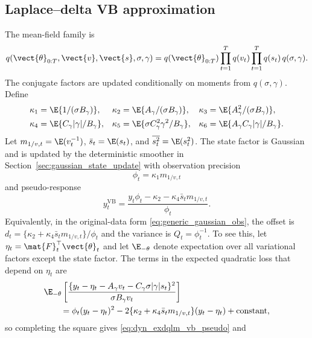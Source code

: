 \subsection{Laplace--delta VB approximation}

The mean-field family is
\begin{equation}
q(\vect{\theta}_{0:T},\vect{v},\vect{s},\sigma,\gamma)
=q(\vect{\theta}_{0:T})\prod_{t=1}^Tq(v_t)\prod_{t=1}^Tq(s_t)\,q(\sigma,\gamma).
\label{eq:dyn_exdqlm_mf}
\end{equation}
The conjugate factors are updated conditionally on moments from
$q(\sigma,\gamma)$. Define
\begin{align}
\kappa_1 &= \E\{1/(\sigma B_\gamma)\},&
\kappa_2 &= \E\{A_\gamma/(\sigma B_\gamma)\},&
\kappa_3 &= \E\{A_\gamma^2/(\sigma B_\gamma)\},\\
\kappa_4 &= \E\{C_\gamma|\gamma|/B_\gamma\},&
\kappa_5 &= \E\{\sigma C_\gamma^2\gamma^2/B_\gamma\},&
\kappa_6 &= \E\{A_\gamma C_\gamma|\gamma|/B_\gamma\}.
\label{eq:dyn_exdqlm_kappa}
\end{align}
Let $m_{1/v,t}=\E(v_t^{-1})$, $\bar s_t=\E(s_t)$, and
$\overline{s_t^2}=\E(s_t^2)$. The state factor is Gaussian and is updated by
the deterministic smoother in Section~\ref{sec:gaussian_state_update} with
observation precision
\begin{equation}
\phi_t=\kappa_1m_{1/v,t}
\label{eq:dyn_exdqlm_vb_precision}
\end{equation}
and pseudo-response
\begin{equation}
y_t^{\mathrm{VB}}
=
\frac{
y_t\phi_t-\kappa_2-\kappa_4\bar s_t m_{1/v,t}
}{\phi_t}.
\label{eq:dyn_exdqlm_vb_pseudo}
\end{equation}
Equivalently, in the original-data form
\eqref{eq:generic_gaussian_obs}, the offset is
$d_t=\{\kappa_2+\kappa_4\bar s_t m_{1/v,t}\}/\phi_t$ and the variance is
$Q_t=\phi_t^{-1}$. To see this, let
$\eta_t=\mat{F}_t^\top\vect{\theta}_t$ and let $\E_{-\theta}$ denote
expectation over all variational factors except the state factor. The terms
in the expected quadratic loss that depend on $\eta_t$ are
\begin{align}
&\E_{-\theta}\left[
\frac{
\{y_t-\eta_t-A_\gamma v_t-C_\gamma\sigma|\gamma|s_t\}^2
}{
\sigma B_\gamma v_t
}
\right] \nonumber\\
&\qquad =
\phi_t(y_t-\eta_t)^2
-
2\{\kappa_2+\kappa_4\bar s_t m_{1/v,t}\}(y_t-\eta_t)
+\text{constant},
\label{eq:dyn_exdqlm_ldvb_state_square}
\end{align}
so completing the square gives \eqref{eq:dyn_exdqlm_vb_pseudo} and
